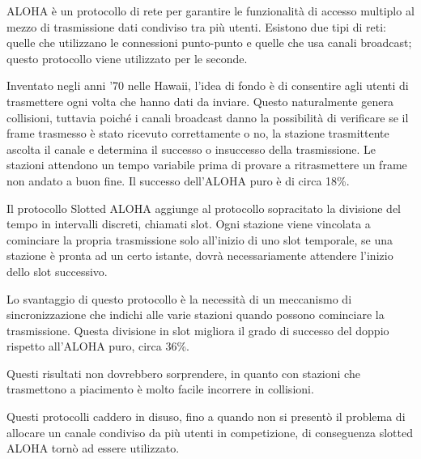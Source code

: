 ALOHA è un protocollo di rete per garantire le funzionalità di accesso multiplo al mezzo di trasmissione dati condiviso tra più utenti. Esistono due tipi di reti: quelle che utilizzano le connessioni punto-punto e quelle che usa canali broadcast; questo protocollo viene utilizzato per le seconde.

Inventato negli anni ’70 nelle Hawaii, l’idea di fondo è di consentire agli utenti di trasmettere ogni volta che hanno dati da inviare. Questo naturalmente genera collisioni, tuttavia poiché i canali broadcast danno la possibilità di verificare se il frame trasmesso è stato ricevuto correttamente o no, la stazione trasmittente ascolta il canale e determina il successo o insuccesso della trasmissione.
Le stazioni attendono un tempo variabile prima di provare a ritrasmettere un frame non andato a buon fine.
Il successo dell’ALOHA puro è di circa 18\%.

Il protocollo Slotted ALOHA aggiunge al protocollo sopracitato la divisione del tempo in intervalli discreti, chiamati slot. Ogni stazione viene vincolata a cominciare la propria trasmissione solo all’inizio di uno slot temporale, se una stazione è pronta ad un certo istante, dovrà necessariamente attendere l’inizio dello slot successivo.

Lo svantaggio di questo protocollo è la necessità di un meccanismo di sincronizzazione che indichi alle varie stazioni quando possono cominciare la trasmissione.
Questa divisione in slot migliora il grado di successo del doppio rispetto all’ALOHA puro, circa 36\%.

Questi risultati non dovrebbero sorprendere, in quanto con stazioni che trasmettono a piacimento è molto facile incorrere in collisioni.

Questi protocolli caddero in disuso, fino a quando non si presentò il problema di allocare un canale condiviso da più utenti in competizione, di conseguenza slotted ALOHA tornò ad essere utilizzato.
  
